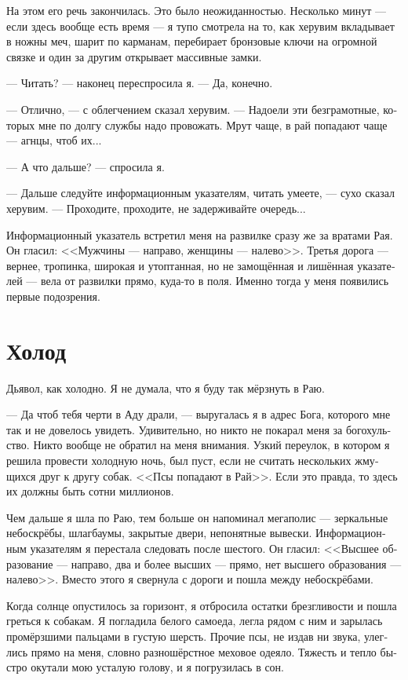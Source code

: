 \documentclass[a4paper,10pt,fleqn]{book}\usepackage{polyglossia}\setdefaultlanguage[babelshorthands=true]{russian}\setotherlanguage{english}\defaultfontfeatures{Ligatures=TeX,Mapping=tex-text}\usepackage{xcolor}\newcommand{\ml}[3]{#2}
\begin{document}
На этом его речь закончилась.
Это было неожиданностью.
Несколько минут --- если здесь вообще есть время --- я тупо смотрела на то, как херувим вкладывает в ножны меч, шарит по карманам, перебирает бронзовые ключи на огромной связке и один за другим открывает массивные замки.

--- Читать? --- наконец переспросила я.
--- Да, конечно.

--- Отлично, --- с облегчением сказал херувим.
--- Надоели эти безграмотные, которых мне по долгу службы надо провожать.
Мрут чаще, в рай попадают чаще --- агнцы, чтоб их...

--- А что дальше? --- спросила я.

--- Дальше следуйте информационным указателям, читать умеете, --- сухо сказал херувим.
--- Проходите, проходите, не задерживайте очередь...

Информационный указатель встретил меня на развилке сразу же за вратами Рая.
Он гласил: <<Мужчины --- направо, женщины --- налево>>.
Третья дорога --- вернее, тропинка, широкая и утоптанная, но не замощённая и лишённая указателей --- вела от развилки прямо, куда-то в поля.
Именно тогда у меня появились первые подозрения.

\section{Холод}

Дьявол, как холодно.
Я не думала, что я буду так мёрзнуть в Раю.

--- Да чтоб тебя черти в Аду драли, --- выругалась я в адрес Бога, которого мне так и не довелось увидеть.
Удивительно, но никто не покарал меня за богохульство.
Никто вообще не обратил на меня внимания.
Узкий переулок, в котором я решила провести холодную ночь, был пуст, если не считать нескольких жмущихся друг к другу собак.
<<Псы попадают в Рай>>.
Если это правда, то здесь их должны быть сотни миллионов.

Чем дальше я шла по Раю, тем больше он напоминал мегаполис --- зеркальные небоскрёбы, шлагбаумы, закрытые двери, непонятные вывески.
Информационным указателям я перестала следовать после шестого.
Он гласил: <<Высшее образование --- направо, два и более высших --- прямо, нет высшего образования --- налево>>.
Вместо этого я свернула с дороги и пошла между небоскрёбами.

Когда солнце опустилось за горизонт, я отбросила остатки брезгливости и пошла греться к собакам.
Я погладила белого самоеда, легла рядом с ним и зарылась промёрзшими пальцами в густую шерсть.
Прочие псы, не издав ни звука, улеглись прямо на меня, словно разношёрстное меховое одеяло.
Тяжесть и тепло быстро окутали мою усталую голову, и я погрузилась в сон.
\end{document}

